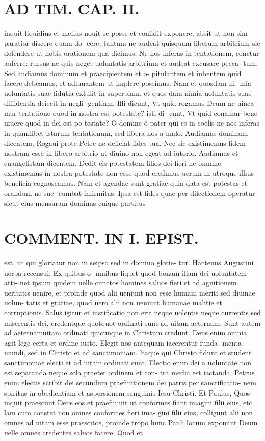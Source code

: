 \documentclass{article}
\begin{document}
\begin{pages}
\section*{AD TIM. CAP. II. }
\marginpar{[ p.115 ]}\pstart inquit liquidius et melius nouit se posse et confidit exponere, absit ut non sim paratior discere quam do- cere, tantum ne audeat quisquam liberum arbitrium sic defendere ut nobis orationem qua dicimus, Ne nos inferas in tentationem, conetur auferre: rursus ne quis neget uoluntatis arbitrium et audeat excusare pecca- tum. Sed audiamus dominum et praecipientem et o- pitulantem et iubentem quid facere debeamus, et adiuuantem ut implere possimus. Nam et quosdam ni- mia uoluntatis suae fidutia extulit in superbiam, et quos dam nimia uoluntatis suae diffidentia deiecit in negli- gentiam. Illi dicunt, Vt quid rogamus Deum ne uinca mur tentatione quod in nostra est potestate? isti di- cunt, Vt quid conamur bene uiuere quod in dei est po testate? O domine ô pater qui es in coelis ne nos inferas in quamlibet istarum tentationum, sed libera nos a malo. Audiamus dominum dicentem, Rogaui prote Petre ne deficiat fides tua. Nec sic existimemus fidem nostram esse in libero arbitrio ut diuino non egeat ad iutorio. Audiamus et euangelistam dicentem, Dedit eis potestatem filios dei fieri ne omnino existimemus in nostra potestate non esse quod credimus uerum in utroque illius beneficia cognoscamus. Nam et agendae sunt gratiae quia data est potestas et orandum ne suc- cumbat infirmitas. Ipsa est fides quae per dilectionem operatur sicut eius mensuram dominus cuique partitus  \pend
\section*{COMMENT. IN I. EPIST. }\pstart est, ut qui gloriatur non in seipso sed in domino glorie- tur. Hactenus Augustini uerba recensui. Ex quibus o- mnibus liquet quod bonam illam dei uoluntatem atti- net ipsum quidem uelle cunctos homines saluos fieri et ad agnitionem ueritatis uenire, et proinde quod alii ueniunt non esse humani meriti sed diuinae uolun- tatis et gratiae, quod uero alii non ueniunt humanae malitie et corruptionis. Salus igitur et iustificatio non erit neque uolentis neque currentis sed miserentis dei, credentque quotquot ordinati sunt ad uitam aeternam. Sunt autem ad aeternamuitam ordinati quicunque in Christum credunt. Deus enim omnia agit lege certa et ordine iusto. Elegit nos antequam iacerentur funda- menta mundi, sed in Christo et ad sanctimoniam. ltaque  qui Christo fidunt et student sanctimoniae electi et ad uitam ordinati sunt. Electio enim dei a uoluntate non est separanda neque sola praeter ordinem et con- tra media est iactanda. Petrus enim electis scribit dei secundum praefinitionem dei patris per sanctificatio- nem spiritus in obedientiam et aspersionem sanguinis Iesu Christi. Et Paulus, Quos inquit praesciuit Deus eos et praefiniuit ut conformes fiant imagini filii eius, etc. lam cum constet non omnes conformes fieri ima- gini filii eius, colligunt alii non omnes ad uitam esse praescitos, proinde tropo hunc Pauli locum exponunt Deum uelle omnes credentes saluos facere. Quod et  \pend

\end{pages}
\end{document}
